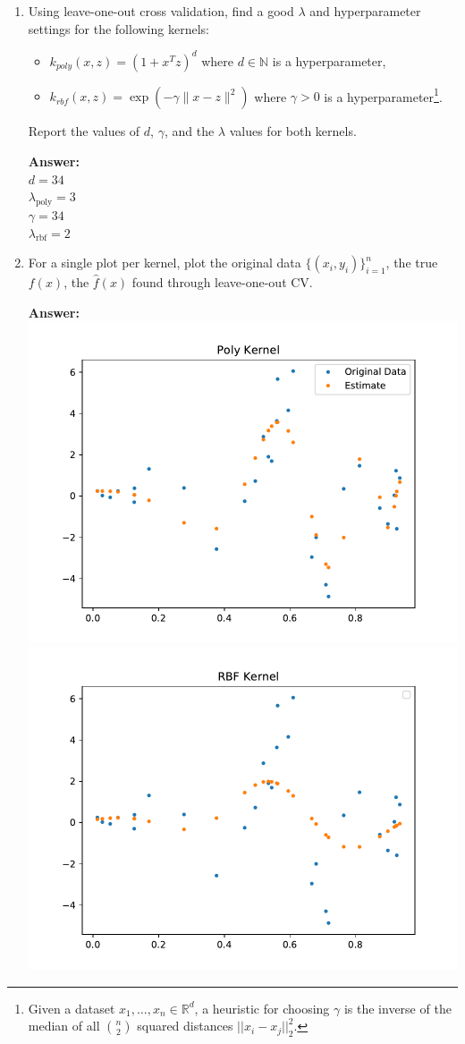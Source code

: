 \documentclass{article}
\newcommand{\field}[1]{\mathbb{#1}}
\newcommand{\1}{\mathbf{1}}
\newcommand{\R}{\field{R}} %
\begin{document}
\begin{enumerate}
  \item Using leave-one-out cross validation, find a good $\lambda$ and hyperparameter settings for the following kernels:
  \begin{itemize}
    \item $k_{poly}(x,z) = (1+x^Tz)^d$ where $d \in \mathbb{N}$ is a hyperparameter, 
    \item $k_{rbf}(x,z) = \exp(-\gamma \|x-z\|^2)$ where $\gamma > 0$ is a hyperparameter\footnote{Given a dataset $x_1,\dots,x_n \in \R^d$, a heuristic for choosing $\gamma$ is the inverse of the median of all $\binom{n}{2}$ squared distances $||x_i-x_j||_2^2$.}.
  \end{itemize} 
Report the values of $d$, $\gamma$, and the $\lambda$ values for both kernels.

\textbf{Answer:}\\
$d=34$\\
$\lambda_\text{poly}=3$ \\

$\gamma= 34$\\
$\lambda_\text{rbf}= 2$

  \item For a single plot per kernel, plot the original data $\{(x_i,y_i)\}_{i=1}^n$, the true $f(x)$, the $\widehat{f}(x)$ found through leave-one-out CV.
  
  \textbf{Answer:}\\
\includegraphics[width=4 in]{Figures/poly_kernel.pdf}\\
\includegraphics[width=4 in]{Figures/rbf_kernel.pdf}  



\end{enumerate}
\end{document}
